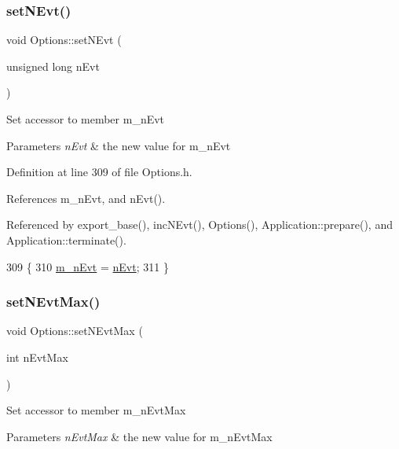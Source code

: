 \subsubsection{\texorpdfstring{set\+N\+Evt()}{setNEvt()}}
{\footnotesize\ttfamily void Options\+::set\+N\+Evt (\begin{DoxyParamCaption}\item[{unsigned long}]{n\+Evt }\end{DoxyParamCaption})\hspace{0.3cm}{\ttfamily [inline]}}

Set accessor to member m\+\_\+n\+Evt 
\begin{DoxyParams}{Parameters}
{\em n\+Evt} & the new value for m\+\_\+n\+Evt \\
\hline
\end{DoxyParams}


Definition at line 309 of file Options.\+h.



References m\+\_\+n\+Evt, and n\+Evt().



Referenced by export\+\_\+base(), inc\+N\+Evt(), Options(), Application\+::prepare(), and Application\+::terminate().


\begin{DoxyCode}
309                                           \{
310                 \hyperlink{classOptions_a5e3bb1f2dfc4bf10cab08a33253cc4db}{m\_nEvt} = \hyperlink{classOptions_ad769b256263a4ac24dd6f989ae724ab7}{nEvt};
311         \}
\end{DoxyCode}
\mbox{\label{classOptions_a6d732c0591188469287581bac8a4e3cd}} 
\subsubsection{\texorpdfstring{set\+N\+Evt\+Max()}{setNEvtMax()}}
{\footnotesize\ttfamily void Options\+::set\+N\+Evt\+Max (\begin{DoxyParamCaption}\item[{int}]{n\+Evt\+Max }\end{DoxyParamCaption})\hspace{0.3cm}{\ttfamily [inline]}}

Set accessor to member m\+\_\+n\+Evt\+Max 
\begin{DoxyParams}{Parameters}
{\em n\+Evt\+Max} & the new value for m\+\_\+n\+Evt\+Max \\
\hline
\end{DoxyParams}


